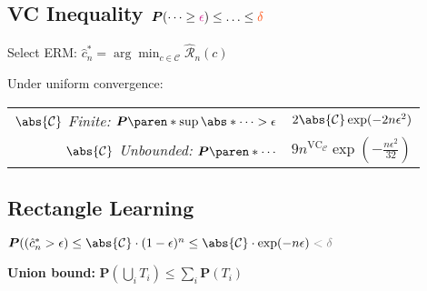 \subsection{VC Inequality
\hfill $\bm P(\cdots \geq \begingroup\color{VioletRed}\epsilon\endgroup) \leq \ldots \leq \color{OrangeRed}\delta$}

Select ERM:\enskip
$\hat c_n^\ast = \arg\min_{c\in\mathcal C} \hat{\mathcal R}_n (c)$

Under uniform convergence: %

\begin{tabular}{@{\textbullet\:} r @{$\:\leq\:$} l @{}}
    \emph{$\abs{\mathcal C}$ Finite:}\enskip
    $\bm P \paren*{ \sup \abs*{\cdots} > \epsilon }$
    & $2 \abs{\mathcal C} \exp(-2n\epsilon^2)$
    \\
    \emph{$\abs{\mathcal C}$ Unbounded:}\hfill
    $\bm P \paren*{ \cdots }$
    & $9 n^{\mathrm{VC}_{\mathcal C}} \exp(-\frac{n \epsilon^2}{32})$
\end{tabular}

\subsection{Rectangle Learning}

$\bm P(\mathcal(\hat c_n^\ast > \epsilon)
\leq \abs{\mathcal C} \cdot (1-\epsilon)^n
\leq \abs{\mathcal C} \cdot \exp(-n\epsilon)
\color{gray} < \delta$

\textbf{Union bound:}\enskip
$\bm P(\bigcup_i T_i) \leq \sum_i \bm P(T_i)$

